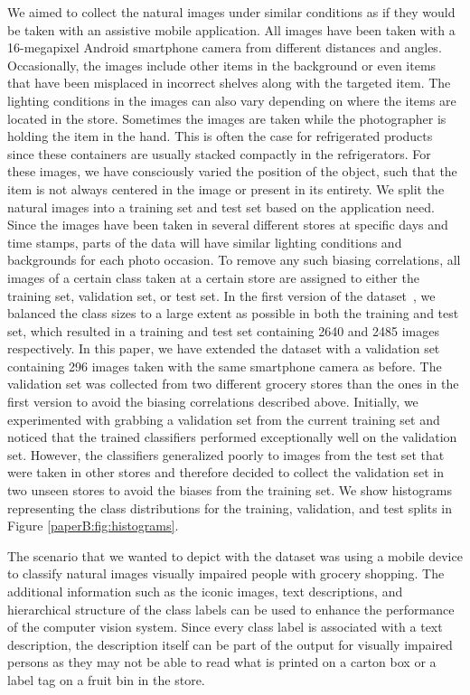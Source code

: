 We aimed to collect the natural images under similar conditions as if they would be taken with an assistive mobile application. 
All images have been taken with a 16-megapixel Android smartphone camera from different distances and angles. 
Occasionally, the images include other items in the background or even items that have been misplaced in incorrect shelves along with the targeted item.
The lighting conditions in the images can also vary depending on where the items are located in the store. Sometimes the images are taken while the photographer is holding the item in the hand. This is often the case for refrigerated products since these containers are usually stacked compactly in the refrigerators. For these images, we have consciously varied the position of the object, such that the item is not always centered in the image or present in its entirety. We split the natural images into a training set and test set based on the application need. Since the images have been taken in several different stores at specific days and time stamps, parts of the data will have similar lighting conditions and backgrounds for each photo occasion. To remove any such biasing correlations, all images of a certain class taken at a certain store are assigned to either the training set, validation set, or test set. In the first version of the dataset~, we balanced the class sizes to a large extent as possible in both the training and test set, which resulted in a training and test set containing 2640 and 2485 images respectively. In this paper, we have extended the dataset with a validation set containing 296 images taken with the same smartphone camera as before. The validation set was collected from two different grocery stores than the ones in the first version to avoid the biasing correlations described above. 
Initially, we experimented with grabbing a validation set from the current training set and noticed that the trained classifiers performed exceptionally well on the validation set. However, the classifiers generalized poorly to images from the test set that were taken in other stores and therefore decided to collect the validation set in two unseen stores to avoid the biases from the training set. We show histograms representing the class distributions for the training, validation, and test splits in Figure \ref{paperB:fig:histograms}. %

The scenario that we wanted to depict with the dataset was using a mobile device to classify natural images visually impaired people with grocery shopping. The additional information such as the iconic images, text descriptions, and hierarchical structure of the class labels can be used to enhance the performance of the computer vision system. Since every class label is associated with a text description, the description itself can be part of the output for visually impaired persons as they may not be able to read what is printed on a carton box or a label tag on a fruit bin in the store. 

